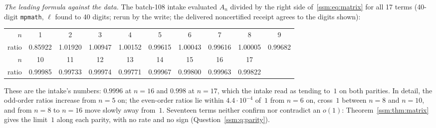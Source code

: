 \begin{remark}
\emph{The leading formula against the data.} The batch-108 intake evaluated
$A_n$ divided by the right side of~\eqref{ssm:eq:matrix} for all 17 terms
(40-digit \texttt{mpmath}, $\ell$ found to 40 digits; rerun by the write;
the delivered noncertified receipt 
agrees to the digits shown):
\begin{center}\small
\begin{tabular}{@{}r*{9}{c}@{}}
\toprule
$n$ & 1 & 2 & 3 & 4 & 5 & 6 & 7 & 8 & 9\\
ratio & 0.85922 & 1.01920 & 1.00947 & 1.00152 & 0.99615 & 1.00043 & 0.99616 & 1.00005 & 0.99682\\
\midrule
$n$ & 10 & 11 & 12 & 13 & 14 & 15 & 16 & 17 & \\
ratio & 0.99985 & 0.99733 & 0.99974 & 0.99771 & 0.99967 & 0.99800 & 0.99963 & 0.99822 & \\
\bottomrule
\end{tabular}
\end{center}
These are the intake's numbers: $0.9996$ at $n=16$ and $0.998$ at $n=17$,
which the intake read as tending to~$1$ on both parities. In detail, the
odd-order ratios increase from $n=5$ on; the even-order ratios lie within
$4.4\cdot10^{-4}$ of~$1$ from $n=6$ on, cross~$1$ between $n=8$ and $n=10$,
and from $n=8$ to $n=16$ move slowly away from~$1$. Seventeen terms neither
confirm nor contradict an $o(1)$: Theorem~\ref{ssm:thm:matrix} gives the
limit~$1$ along each parity, with no rate and no sign
(Question~\ref{ssm:q:parity}).
\end{remark}

